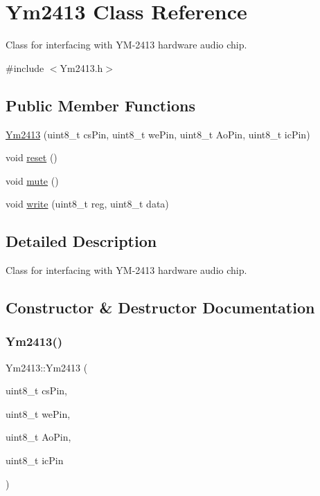 \hypertarget{classYm2413}{}\section{Ym2413 Class Reference}
\label{classYm2413}


Class for interfacing with Y\+M-\/2413 hardware audio chip.  




{\ttfamily \#include $<$Ym2413.\+h$>$}

\subsection*{Public Member Functions}
\begin{DoxyCompactItemize}
\item 
\mbox{\hyperlink{classYm2413_ac7d4c6006a15a3c28f456027540a7ffc}{Ym2413}} (uint8\+\_\+t cs\+Pin, uint8\+\_\+t we\+Pin, uint8\+\_\+t Ao\+Pin, uint8\+\_\+t ic\+Pin)
\item 
void \mbox{\hyperlink{classYm2413_a826e19d5236517bd5eedc1f9665495d2}{reset}} ()
\item 
void \mbox{\hyperlink{classYm2413_a23ad08f449b2fc58671802f853ade7d9}{mute}} ()
\item 
void \mbox{\hyperlink{classYm2413_ae0a5d7f90288c0753943efe28fad6224}{write}} (uint8\+\_\+t reg, uint8\+\_\+t data)
\end{DoxyCompactItemize}


\subsection{Detailed Description}
Class for interfacing with Y\+M-\/2413 hardware audio chip. 

\subsection{Constructor \& Destructor Documentation}
\mbox{\label{classYm2413_ac7d4c6006a15a3c28f456027540a7ffc}} 
\subsubsection{\texorpdfstring{Ym2413()}{Ym2413()}}
{\footnotesize\ttfamily Ym2413\+::\+Ym2413 (\begin{DoxyParamCaption}\item[{uint8\+\_\+t}]{cs\+Pin,  }\item[{uint8\+\_\+t}]{we\+Pin,  }\item[{uint8\+\_\+t}]{Ao\+Pin,  }\item[{uint8\+\_\+t}]{ic\+Pin }\end{DoxyParamCaption})}

